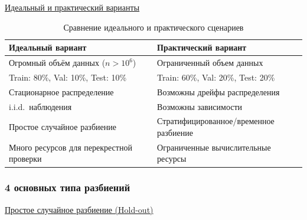\underline{Идеальный и практический варианты}

\begin{table}[h]
    \centering
    \begin{tabular}{|p{}|p{}|}
        \hline
        \textbf{Идеальный вариант}               & \textbf{Практический вариант}          \\ \hline
        Огромный объём данных ($n > 10^6$)       & Ограниченный объем данных              \\ \hline
        Train: 80\%, Val: 10\%, Test: 10\%       & Train: 60\%, Val: 20\%, Test: 20\%     \\ \hline
        Стационарное распределение               & Возможны дрейфы распределения          \\ \hline
        i.i.d.\ наблюдения                       & Возможны зависимости                   \\ \hline
        Простое случайное разбиение              & Стратифицированное/временное разбиение \\ \hline
        Много ресурсов для перекрестной проверки & Ограниченные вычислительные ресурсы    \\ \hline
    \end{tabular}
    \caption{Сравнение идеального и практического сценариев}
    \label{tab:ideal practice}
\end{table}

\subsubsection{4 основных типа разбиений}

\underline{Простое случайное разбиение (Hold-out)}


